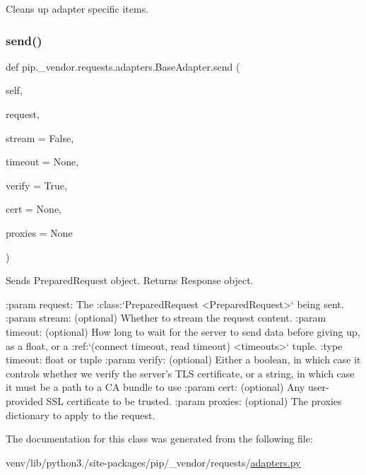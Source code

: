 \begin{DoxyVerb}Cleans up adapter specific items.\end{DoxyVerb}
 \mbox{\label{classpip_1_1__vendor_1_1requests_1_1adapters_1_1BaseAdapter_a837d77918210137cc87558a6e24621c7}} 
\subsubsection{\texorpdfstring{send()}{send()}}
{\footnotesize\ttfamily def pip.\+\_\+vendor.\+requests.\+adapters.\+Base\+Adapter.\+send (\begin{DoxyParamCaption}\item[{}]{self,  }\item[{}]{request,  }\item[{}]{stream = {\ttfamily False},  }\item[{}]{timeout = {\ttfamily None},  }\item[{}]{verify = {\ttfamily True},  }\item[{}]{cert = {\ttfamily None},  }\item[{}]{proxies = {\ttfamily None} }\end{DoxyParamCaption})}

\begin{DoxyVerb}Sends PreparedRequest object. Returns Response object.

:param request: The :class:`PreparedRequest <PreparedRequest>` being sent.
:param stream: (optional) Whether to stream the request content.
:param timeout: (optional) How long to wait for the server to send
    data before giving up, as a float, or a :ref:`(connect timeout,
    read timeout) <timeouts>` tuple.
:type timeout: float or tuple
:param verify: (optional) Either a boolean, in which case it controls whether we verify
    the server's TLS certificate, or a string, in which case it must be a path
    to a CA bundle to use
:param cert: (optional) Any user-provided SSL certificate to be trusted.
:param proxies: (optional) The proxies dictionary to apply to the request.
\end{DoxyVerb}
 

The documentation for this class was generated from the following file\+:\begin{DoxyCompactItemize}
\item 
venv/lib/python3./site-\/packages/pip/\+\_\+vendor/requests/\hyperlink{adapters_8py}{adapters.\+py}\end{DoxyCompactItemize}

